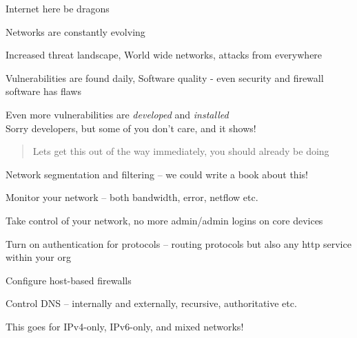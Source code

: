 \documentclass[Screen16to9,17pt]{foils}
\begin{document}

\centerline{\Large Internet here be dragons}

\begin{list2}
\item Networks are constantly evolving
\item Increased threat landscape, World wide networks, attacks from everywhere
\item Vulnerabilities are found daily, Software quality - even security and firewall software has flaws
\item Even more vulnerabilities are \emph{developed} and \emph{installed}\\
Sorry developers, but some of you don't care, and it shows!
\end{list2}



\begin{quote}
Lets get this out of the way immediately, you should already be doing
\end{quote}

\begin{list2}
\item Network segmentation and filtering -- we could write a book about this! {\myalert}
\item Monitor your network -- both bandwidth, error, netflow etc. {\myalert}
\item Take control of your network, no more admin/admin logins on core devices {\myalert}
\item Turn on authentication for protocols -- routing protocols but also any http service within your org {\myalert}
\item Configure host-based firewalls {\myalert}
\item Control DNS -- internally and externally, recursive, authoritative etc. {\myalert}
\end{list2}

\centerline{This goes for IPv4-only, IPv6-only, and mixed networks!}


\end{document}
